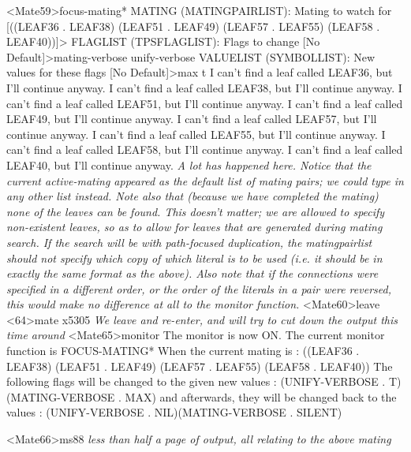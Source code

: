 \begin{tpsexample}
<Mate59>focus-mating*
MATING (MATINGPAIRLIST): Mating to watch for [((LEAF36 . LEAF38) (LEAF51 . LEAF49)
(LEAF57 . LEAF55) (LEAF58 . LEAF40))]>
FLAGLIST (TPSFLAGLIST): Flags to change [No Default]>mating-verbose unify-verbose
VALUELIST (SYMBOLLIST): New values for these flags [No Default]>max t
I can't find a leaf called LEAF36, but I'll continue anyway.
I can't find a leaf called LEAF38, but I'll continue anyway.
I can't find a leaf called LEAF51, but I'll continue anyway.
I can't find a leaf called LEAF49, but I'll continue anyway.
I can't find a leaf called LEAF57, but I'll continue anyway.
I can't find a leaf called LEAF55, but I'll continue anyway.
I can't find a leaf called LEAF58, but I'll continue anyway.
I can't find a leaf called LEAF40, but I'll continue anyway.
{\it A lot has happened here. Notice that the current active-mating appeared as the default list of mating pairs;
we could type in any other list instead. Note also that (because we have completed the mating) none of the
leaves can be found. This doesn't matter; we are allowed to specify non-existent leaves, so as to allow for
leaves that are generated during mating search. If the search will be with path-focused duplication, the
matingpairlist should not specify which copy of which literal is to be used (i.e. it should be in exactly the
same format as the above). Also note that if the connections were specified in a different order, or the
order of the literals in a pair were reversed, this would make no difference at all to the monitor function.}
<Mate60>leave
<64>mate x5305
{\it We leave and re-enter, and will try to cut down the output this time around}
<Mate65>monitor
The monitor is now ON.
The current monitor function is FOCUS-MATING*
When the current mating is : ((LEAF36 . LEAF38) (LEAF51 . LEAF49) (LEAF57 . LEAF55) (LEAF58 . LEAF40))
The following flags will be changed to the given new values :
(UNIFY-VERBOSE . T)(MATING-VERBOSE . MAX)
and afterwards, they will be changed back to the values :
(UNIFY-VERBOSE . NIL)(MATING-VERBOSE . SILENT)

<Mate66>ms88
{\it less than half a page of output, all relating to the above mating}
\end{tpsexample}

